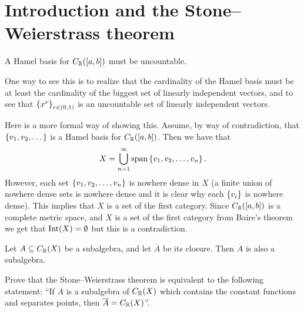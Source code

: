 \documentclass[11pt,a4paper]{article}
\begin{document}
\maketitle

\newpage
\tableofcontents
\newpage

\section{Introduction and the Stone--Weierstrass theorem}

\begin{exercise}
  A Hamel basis for $C_{\mathbb{R}}([a, b])$ must be uncountable.
\end{exercise}
\begin{solution}
  One way to see this is to realize that the cardinality of the
  Hamel basis must be at least the cardinality of the biggest set of
  linearly independent vectors,
  and to see that $\left\{x^r\right\}_{r \in (0,1)}$ is an uncountable set of
  linearly independent vectors.

  Here is a more formal way of showing this.
  Assume, by way of contradiction, that $\left\{v_1,v_2,\dots\right\}$ is a Hamel
  basis for $C_{\mathbb{R}}([a,b])$.
  Then we have that
  \[
    X = \bigcup_{n=1}^{\infty} \operatorname{span}\left\{v_1,v_2,\dots,v_n\right\}.
  \]
  However, each set $\left\{v_1,v_2,\dots,v_n\right\}$ is nowhere
  dense in $X$ (a finite union of nowhere dense sets is nowhere dense
  and it is clear why each $\left\{v_i\right\}$ is nowhere dense).
  This implies that $X$ is a set of the first category.
  Since $C_{\mathbb{R}}([a,b])$ is a complete metric space,
  and $X$ is a set of the first category from Baire's theorem we
  get that $\operatorname{Int}(X) = \emptyset$ but this is a contradiction.
\end{solution}

\begin{exercise}
  Let $A \subseteq C_{\mathbb{R}}(X)$ be a subalgebra,
  and let $\overline A$ be its closure.
  Then $\overline A$ is also a subalgebra.
\end{exercise}
\begin{solution}

\end{solution}

\begin{exercise}
  Prove that the Stone--Weierstrass theorem is equivalent to
  the following statement:
  ``If $A$ is a subalgebra of $C_{\mathbb{R}}(X)$ which contains the constant
  functions and separates points, then $\overline A = C_{\mathbb{R}}(X)$''.
\end{exercise}
\begin{solution}

\end{solution}
\end{document}

